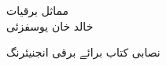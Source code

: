 \begin{titlepage}
\begin{center}
{\Huge {مماثل برقیات}}\\
\vspace{1cm}
{\large{خالد خان یوسفزئی}}\\
\vfill
\end{center}
\begin{flushright}
{\small{نصابی کتاب برائے برقی انجنیئرنگ}}
\end{flushright}
\end{titlepage}
